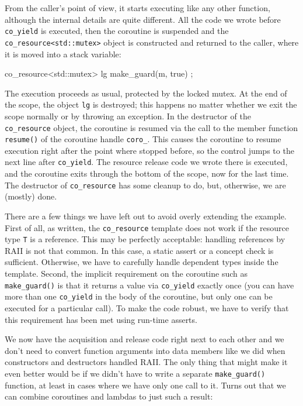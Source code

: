 From the caller's point of view, it starts executing like any other function, although the internal details are quite different. All the code we wrote before \texttt{co\_yield} is executed, then the coroutine is suspended and the \texttt{co\_resource\textless{}std::mutex\textgreater{}} object is constructed and returned to the caller, where it is moved into a stack variable:

\begin{code}
co_resource<std::mutex> lg { make_guard(m, true) };
\end{code}

The execution proceeds as usual, protected by the locked mutex. At the end of the scope, the object \texttt{lg} is destroyed; this happens no matter whether we exit the scope normally or by throwing an exception. In the destructor of the \texttt{co\_resource} object, the coroutine is resumed via the call to the member function \texttt{resume()} of the coroutine handle \texttt{coro\_}. This causes the coroutine to resume execution right after the point where stopped before, so the control jumps to the next line after \texttt{co\_yield}. The resource release code we wrote there is executed, and the coroutine exits through the bottom of the scope, now for the last time. The destructor of \texttt{co\_resource} has some cleanup to do, but, otherwise, we are (mostly) done.

There are a few things we have left out to avoid overly extending the example. First of all, as written, the \texttt{co\_resource} template does not work if the resource type \texttt{T} is a reference. This may be perfectly acceptable: handling references by RAII is not that common. In this case, a static assert or a concept check is sufficient. Otherwise, we have to carefully handle dependent types inside the template. Second, the implicit requirement on the coroutine such as \texttt{make\_guard()} is that it returns a value via \texttt{co\_yield} exactly once (you can have more than one \texttt{co\_yield} in the body of the coroutine, but only one can be executed for a particular call). To make the code robust, we have to verify that this requirement has been met using run-time asserts.

We now have the acquisition and release code right next to each other and we don't need to convert function arguments into data members like we did when constructors and destructors handled RAII. The only thing that might make it even better would be if we didn't have to write a separate \texttt{make\_guard()} function, at least in cases where we have only one call to it. Turns out that we can combine coroutines and lambdas to just such a result:

